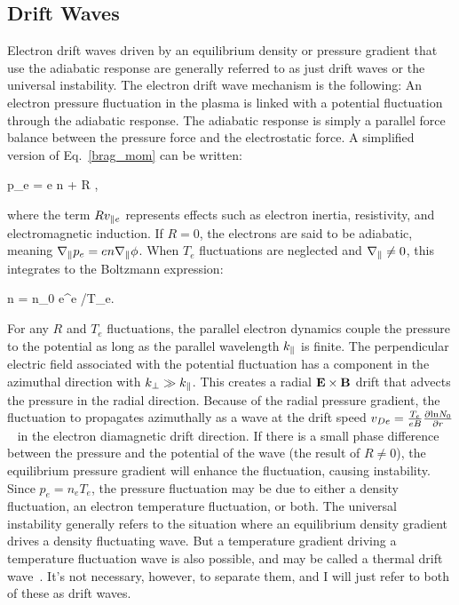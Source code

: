\subsection{Drift Waves}
\label{ss_drift_waves}

Electron drift waves driven by an equilibrium density or pressure gradient that use the adiabatic response are generally referred to as just drift waves or the universal instability.
The electron drift wave mechanism is the following: An electron pressure fluctuation in the plasma is linked with a potential fluctuation through the adiabatic response. The adiabatic
response is simply a parallel force balance between the pressure force and the electrostatic force. A simplified version of Eq.~\ref{brag_mom} can be written:

\beq
\label{adiabatic_response}
\gradpar p_e = e n \gradpar \phi + R \vpe,
\eeq

where the term $R v_{\parallel e}$ represents effects such as electron inertia, resistivity, and electromagnetic induction. If $R=0$, the electrons are said to be adiabatic, meaning 
$\nabla_\parallel p_e = e n \nabla_\parallel \phi$. When $T_e$ fluctuations are neglected and $\nabla_\parallel \ne 0$, this integrates to the Boltzmann expression:

\beq
\label{boltzmann_exp}
n = n_0 e^{e \phi/T_e}.
\eeq

For any $R$ and $T_e$ fluctuations, the parallel electron dynamics couple the pressure to the potential as long as the parallel wavelength $k_\parallel$ is finite. 
The perpendicular electric field associated with the potential fluctuation has a component in the azimuthal direction with $k_\perp \gg k_\parallel$. 
This creates a radial ${\bf E \times B}$ drift that advects the pressure in the radial direction. Because of the radial pressure gradient,
the fluctuation to propagates azimuthally as a wave at the drift speed $v_{De} = \frac{T_e}{e B} \frac{\partial{\rm ln} N_0}{\partial r}$~\cite{chen2006} in the electron diamagnetic drift direction. 
If there is a small phase difference between the pressure and the potential of the wave (the result of $R \ne 0$), the equilibrium pressure gradient will enhance the fluctuation, causing
instability. Since $p_e = n_e T_e$, the pressure fluctuation may be due to either a density fluctuation, an electron temperature fluctuation, or both. The universal instability generally
refers to the situation where an equilibrium density gradient drives a density fluctuating wave. But a temperature gradient driving a temperature fluctuation wave is also possible, and
may be called a thermal drift wave~\cite{makwana2011}. It's not necessary, however, to separate them, and I will just refer to both of these as drift waves.

